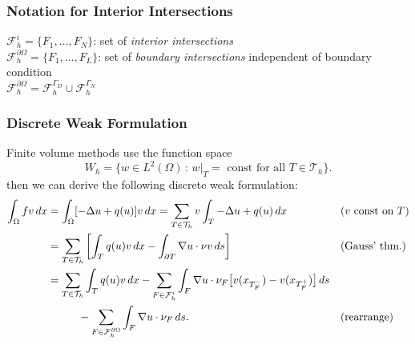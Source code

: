 \documentclass[aspectratio=169,11pt]{beamer}
\theoremstyle{definition}
\begin{document}
\begin{frame}
\frametitle{Notation for Interior Intersections}
\begin{center}
\hspace{0.1\textwidth}
\end{center}
$\mathcal{F}_h^i=\{F_1,\ldots,F_N\}$: set of {\em interior intersections}\\
\medskip
$\mathcal{F}_h^{\partial\Omega}=\{F_1,\ldots,F_L\}$: set of {\em boundary intersections}
independent of boundary condition\\
\medskip
$\mathcal{F}_h^{\partial\Omega} = \mathcal{F}_h^{\Gamma_D}  \cup \mathcal{F}_h^{\Gamma_N}$
\end{frame}

\begin{frame}
\frametitle{Discrete Weak Formulation}
Finite volume methods use the function space
\begin{equation*}
W_h = \{w\in L^2(\Omega) \,:\,  \text{$w|_T=$ const for all $T\in\mathcal{T}_h$}\} .
\end{equation*}
then we can derive the following discrete weak formulation:
{\small\begin{align*}
\int_{\Omega} f v \,dx &= \int_{\Omega} [-\Delta u + q(u)] v\,dx
= \sum_{T\in\mathcal{T}_h} v \int_T -\Delta u + q(u) \,dx &&\text{($v$ const on $T$)}\\
&= \sum_{T\in\mathcal{T}_h} \left[\int_T q(u) v \,dx - \int_{\partial T} \nabla u \cdot \nu v \,ds
\right] &&\text{(Gauss' thm.)} \\
&= \sum_{T\in\mathcal{T}_h} \int_T q(u) v \,dx
-\sum_{F\in\mathcal{F}_h^i} \int_F \nabla u \cdot \nu_F \bigl[v(x_{T_F^-}) - v(x_{T_F^+})\bigr] \,ds \\
& \hspace{10mm}-\sum_{F\in\mathcal{F}_h^{\partial\Omega}} \int_F \nabla u \cdot \nu_F \,ds .
&&\text{(rearrange)}
\end{align*}}
\end{frame}
\end{document}
